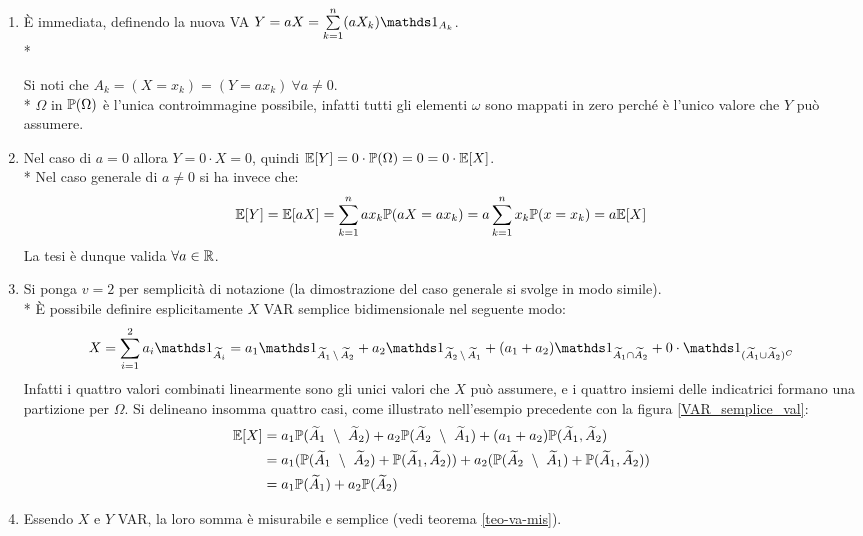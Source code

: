 \begin{dimo}
  \Fixvmode
  \begin{enumerate}
    \item È immediata, definendo la nuova VA $Y = aX = \sum\limits_{k = 1}^{n} (aX_k) \Ind_{A_k}$.\\*

      Si noti che $A_k = (X = x_k) = (Y = ax_k) \ \forall a \neq 0$.\\*
      $\Omega$ in $\mathbb P(\Omega)$ è l'unica controimmagine possibile, infatti tutti gli elementi $\omega$ sono mappati in zero perché è l'unico valore che $Y$ può assumere.
    \item Nel caso di $a = 0$ allora $Y = 0 \cdot X = 0$, quindi $\mathbb E[Y] = 0 \cdot \mathbb P(\Omega) = 0 = 0 \cdot \mathbb E[X]$.\\*
      Nel caso generale di $a \neq 0$ si ha invece che:
      $$\mathbb E[Y] = \mathbb E[aX] = \sum\limits_{k=1}^{n} ax_k \mathbb P(aX = ax_k) = a\sum\limits_{k=1}^n  x_k \mathbb P(x = x_k) = a \mathbb E[X]$$
      La tesi è dunque valida $\forall a \in \mathbb R$.
    \item Si ponga $v = 2$ per semplicità di notazione (la dimostrazione del caso generale si svolge in modo simile).\\*
    È possibile definire esplicitamente $X$ VAR semplice bidimensionale nel seguente modo:
    $$X = \sum\limits_{i=1}^{2} a_i \Ind_{\widetilde A_i} = a_1 \Ind_{\widetilde A_1 \, \setminus \, \widetilde A_2} + a_2 \Ind_{\widetilde A_2 \, \setminus \, \widetilde A_1} + (a_1 + a_2) \Ind_{\widetilde A_1 \cap \widetilde A_2} + 0 \cdot \Ind_{(\widetilde A_1 \cup \widetilde A_2)^C}$$
    Infatti i quattro valori combinati linearmente sono gli unici valori che $X$ può assumere, e i quattro insiemi delle indicatrici formano una partizione per $\Omega$.
    Si delineano insomma quattro casi, come illustrato nell'esempio precedente con la figura \ref{VAR_semplice_val}:
    \begin{align*}
      \EE[X] &= a_1 \PP(\widetilde A_1 \ \setminus \ \widetilde A_2) + a_2  \PP(\widetilde A_2 \ \setminus \ \widetilde A_1) + (a_1 + a_2) \PP(\widetilde A_1, \widetilde A_2)\\
      &= a_1(\PP(\widetilde A_1 \ \setminus \ \widetilde A_2) + \PP(\widetilde A_1, \widetilde A_2)) + a_2(\PP(\widetilde A_2 \ \setminus \ \widetilde A_1) + \PP(\widetilde A_1, \widetilde A_2))\\
      &= a_1 \PP(\widetilde A_1) + a_2 \PP(\widetilde A_2)
    \end{align*}
    \item Essendo $X$ e $Y$ VAR, la loro somma è misurabile e semplice (vedi teorema \ref{teo-va-mis}).

\end{enumerate}
\end{dimo}

